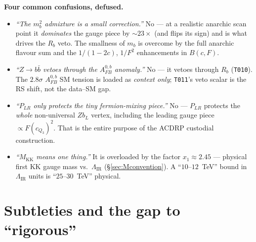 \documentclass[11pt]{article}
\newenvironment{callout}[1]{%
  \par\medskip\begin{shaded}\noindent\textbf{#1}\par\smallskip}{\end{shaded}\medskip}
\newcommand{\MKK}{M_{\mathrm{KK}}}
\newcommand{\LIR}{\Lambda_{\mathrm{IR}}}
\newcommand{\PLR}{P_{LR}}
\newcommand{\code}[1]{\texttt{#1}}
\newcommand{\Afb}{A_{FB}^{0,b}}
\theoremstyle{definition}
\begin{document}
\begin{callout}{Four common confusions, defused.}
\begin{itemize}[leftmargin=1.2em,nosep]
\item[\textbf{A.}] \emph{``The $m_b^2$ admixture is a small correction.''} No ---
at a realistic anarchic scan point it \emph{dominates} the gauge piece by
$\sim 23\times$ (and flips its sign) and is what drives the $R_b$ veto. The
smallness of $m_b$ is overcome by the full anarchic flavour sum and the
$1/(1-2c)$, $1/F^2$ enhancements in $B(c,F)$.
\item[\textbf{B.}] \emph{``$Z\to b\bar b$ vetoes through the $\Afb$ anomaly.''}
No --- it vetoes through \emph{$R_b$} (\code{T010}). The $2.8\sigma$ $\Afb$
SM tension is loaded as \emph{context only}; \code{T011}'s veto scalar is the RS
shift, not the data--SM gap.
\item[\textbf{C.}] \emph{``$\PLR$ only protects the tiny fermion-mixing piece.''}
No --- $\PLR$ protects the \emph{whole} non-universal $Zb_L$ vertex, including the
leading gauge piece $\propto F(c_{Q_3})^2$. That is the entire purpose of the
ACDRP custodial construction.
\item[\textbf{D.}] \emph{``$\MKK$ means one thing.''} It is overloaded by the
factor $x_1\approx 2.45$ --- physical first KK gauge mass vs.\ $\LIR$
(\S\ref{sec:Mconvention}). A ``$10$--$12$~TeV'' bound in $\LIR$ units is
``$25$--$30$~TeV'' physical.
\end{itemize}
\end{callout}

\part{Subtleties and the gap to ``rigorous''}
\label{part:subtle}
\end{document}
